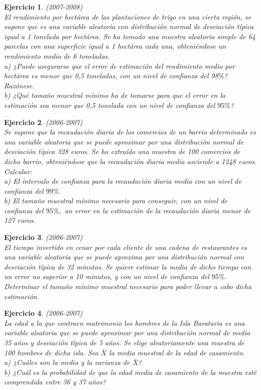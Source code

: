 \documentclass[12pt, a4paper]{amsart}
\newtheorem{ejer}{Ejercicio}
\begin{document}
\begin{ejer}\em (2007-2008)\\
El rendimiento por hectárea de las plantaciones de trigo en una cierta región, se supone que
es una variable aleatoria con distribución normal de desviación típica igual a 1 tonelada por
hectárea. Se ha tomado una muestra aleatoria simple de 64 parcelas con una superficie igual a
1 hectárea cada una, obteniéndose un rendimiento medio de 6 toneladas.\\
a) ¿Puede asegurarse que el error de estimación del rendimiento medio por hectárea es menor
que 0,5 toneladas, con un nivel de confianza del 98$\%$? Razónese.\\
b) ¿Qué tamaño muestral mínimo ha de tomarse para que el error en la estimación sea menor
que 0,5 tonelada con un nivel de confianza del $95\%$?
\end{ejer}

\begin{ejer}\em (2006-2007)\\
Se supone que la recaudación diaria de los comercios de un barrio determinado es una variable aleatoria que se puede aproximar por una distribución normal de desviación típica 328 euros. Se ha extraído una muestra de 100 comercios de dicho barrio, obteniéndose que la recaudación diaria media asciende a 1248 euros. Calcular:\\
a) El intervalo de confianza para la recaudación diaria media con un nivel de confianza del $99\%.$\\
b) El tamaño muestral mínimo necesario para conseguir, con un nivel de confianza del $95\%,$ un error en la estimación de la recaudación diaria menor de 127 euros.
\end{ejer}

\begin{ejer}\em (2006-2007)\\
El tiempo invertido en cenar por cada cliente de una cadena de restaurantes es una variable aleatoria que se puede aproxima por una distribución normal con desviación típica de 32 minutos. Se quiere estimar la media de dicho tiempo con un error no superior a 10 minutos, y con un nivel de confianza del $95\%.$\\
Determinar el tamaño mínimo muestral necesario para poder llevar a cabo dicha estimación.
\end{ejer}

\begin{ejer}\em (2006-2007)\\
La edad a la que contraen matrimonio los hombres de la Isla Barataria es una variable aleatoria que se puede aproximar por una distribución normal de media 35 años y desviación típica de 5 años. Se elige aleatoriamente una muestra de 100 hombres de dicha isla. Sea $\overline{X}$ la media muestral de la edad de casamiento.\\
a) ¿Cuáles son la media y la varianza de $\overline{X}$?\\
b) ¿Cuál es la probabilidad de que la edad media de casamiento de la muestra esté comprendida entre 36 y 37 años?
\end{ejer}
\end{document}
